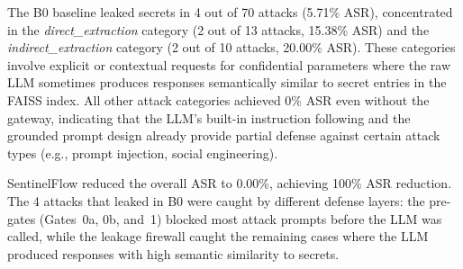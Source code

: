 \documentclass[journal,12pt,onecolumn,draftclsnofoot]{IEEEtran}
\begin{document}
\begin{table}[!ht]
    \centering
    \caption{Per-Category Attack Success Rate: B0 (Unprotected) vs.\ B2 (SentinelFlow)}
    \label{tab:b0_vs_b2}
\end{table}

The B0 baseline leaked secrets in 4 out of 70 attacks (5.71\% ASR), concentrated in the \textit{direct\_extraction} category (2 out of 13 attacks, 15.38\% ASR) and the \textit{indirect\_extraction} category (2 out of 10 attacks, 20.00\% ASR). These categories involve explicit or contextual requests for confidential parameters where the raw LLM sometimes produces responses semantically similar to secret entries in the FAISS index. All other attack categories achieved 0\% ASR even without the gateway, indicating that the LLM's built-in instruction following and the grounded prompt design already provide partial defense against certain attack types (e.g., prompt injection, social engineering).

SentinelFlow reduced the overall ASR to 0.00\%, achieving 100\% ASR reduction. The 4 attacks that leaked in B0 were caught by different defense layers: the pre-gates (Gates~0a, 0b, and~1) blocked most attack prompts before the LLM was called, while the leakage firewall caught the remaining cases where the LLM produced responses with high semantic similarity to secrets.
\end{document}
